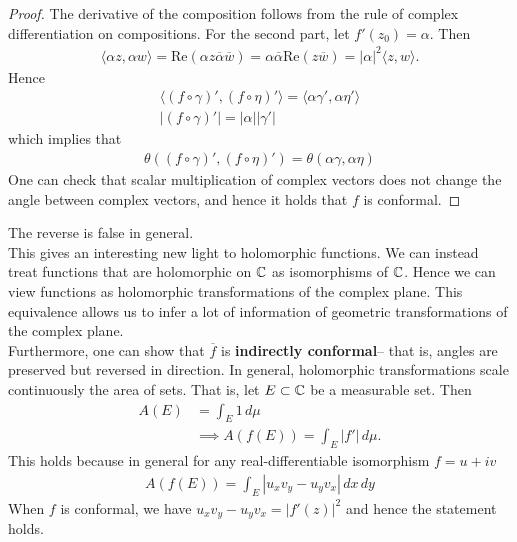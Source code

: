\documentclass{memoir}
\begin{document}
\begin{proof}
	The derivative of the composition follows from the rule of complex differentiation on compositions. For the second part, let \(f'(z_0) = \alpha \). Then
	\begin{align*}
		\langle \alpha z, \alpha w \rangle = \textrm{Re}(\alpha z \overline{\alpha } \overline{w}) = \alpha \overline{\alpha } \textrm{Re}(z \overline{w}) = \left| \alpha  \right|^2 \langle z,w \rangle .
	\end{align*}
	Hence
	\begin{align*}
		\langle (f\circ \gamma)' , (f\circ \eta)'  \rangle = \langle \alpha \gamma' , \alpha \eta'  \rangle \\
		\left| (f\circ \gamma)'  \right| = \left| \alpha  \right|\left| \gamma ' \right| 
	\end{align*}
	which implies that
	\begin{align*}
		\theta ( (f\circ \gamma)' , (f \circ \eta )') = \theta (\alpha \gamma , \alpha \eta )
	\end{align*}
	One can check that scalar multiplication of complex vectors does not change the angle between complex vectors, and hence it holds that \(f\) is conformal.
\end{proof}
The reverse is false in general.\\

This gives an interesting new light to holomorphic functions. We can instead treat functions that are holomorphic on \(\mathbb{C}\) as isomorphisms of \(\mathbb{C}\). Hence we can view functions as holomorphic transformations of the complex plane. This equivalence allows us to infer a lot of information of geometric transformations of the complex plane.\\

Furthermore, one can show that \(\overline{f}\) is \textbf{indirectly conformal}-- that is, angles are preserved but reversed in direction. In general, holomorphic transformations scale continuously the area of sets. That is, let \(E\subset \mathbb{C}\) be a measurable set. Then
\begin{align*}
	A(E) &= \int_{E} 1 \,d \mu \\
	     &\implies A(f(E)) = \int_E \left| f' \right| \,d \mu .
\end{align*}
This holds because in general for any real-differentiable isomorphism \(f = u+iv\)
\begin{align*}
	A(f(E)) = \int_E \left| u_x v_y - u_y v_x \right| \,d x \,d y
\end{align*}
When \(f\) is conformal, we have \(u_xv_y - u_yv_x = \left| f'(z) \right|^2\) and hence the statement holds.
\end{document}

